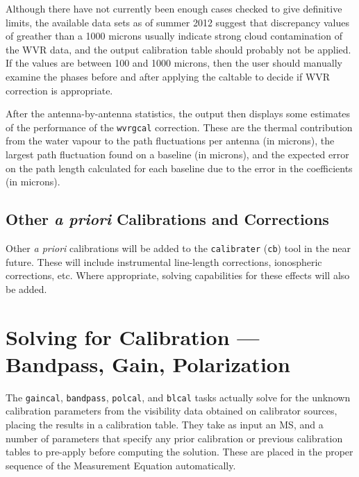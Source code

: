 Although there have not currently been enough cases checked to give
definitive limits, the available data sets as of summer 2012 suggest
that discrepancy values of greather than a 1000 microns usually indicate
strong cloud contamination of the WVR data, and the output calibration
table should probably not be applied. If the values are between 100
and 1000 microns, then the user should manually examine the
phases before and after applying the caltable to decide if WVR
correction is appropriate.

After the antenna-by-antenna statistics, the output then displays some
estimates of the performance of the {\tt wvrgcal} correction. 
These are the thermal contribution from the water vapour to the path
fluctuations per antenna (in microns), the largest path fluctuation
found on a baseline (in microns), and the expected error on the path
length calculated for each baseline due to the error in the
coefficients (in microns). 



\subsection{Other {\it a priori} Calibrations and Corrections}
\label{section:cal.prior.other}

Other {\it a priori} calibrations will be added to the 
{\tt calibrater} ({\tt cb}) tool 
in the near future.  These will include
instrumental line-length corrections, ionospheric corrections, etc.  Where
appropriate, solving capabilities for these effects will also be
added.

\section{Solving for Calibration --- Bandpass, Gain, Polarization}
\label{section:cal.solve}

The {\tt gaincal}, {\tt bandpass}, {\tt polcal}, and {\tt blcal}
tasks actually solve for the unknown calibration parameters from the
visibility data obtained on calibrator sources,
placing the results in a calibration table.  They take as input
an MS, and a number of parameters that specify any prior calibration
or previous calibration tables to pre-apply before computing the
solution.  These are placed in the proper sequence of the Measurement
Equation automatically.

